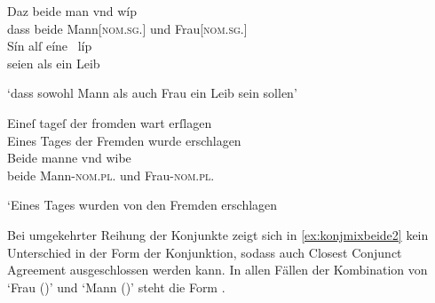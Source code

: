 \begin{exe}
\ex \label{ex:konjmixbeide1}
	\begin{xlist}
	\ex \gll Daz beide man vnd wíp \\
			dass beide Mann[\textsc{nom.sg.\MascM}] und Frau[\textsc{nom.sg.\NeutF}] \\
	\sn \gll Sín alſ eíne~ líp \\
			seien als ein Leib \\
		\begin{taggedline}{\parencites[\pno~45vb,12--13]{kc:VB}[vgl.][9536--9537]{schroeder1895}}
		\trans `dass sowohl Mann als auch Frau ein Leib sein sollen'
		\end{taggedline}
		\label{ex:konjmixbeide1_1}

	\ex \label{ex:konjmixbeide1_2}
		\gll Eineſ tageſ der fromden wart erſlagen \\
			Eines Tages der Fremden wurde erschlagen \\
		\textelp{}
	\sn \gll Beide manne vnd wibe \\
			beide Mann-\textsc{nom.pl.\MascM} und Frau-\textsc{nom.pl.\NeutF} \\
		\begin{taggedline}{\parencites[\pno~3vb,11--14]{kc:VB}[vgl.][625--628]{schroeder1895}}
		\trans `Eines Tages wurden von den Fremden erschlagen 
		\end{taggedline}
	\end{xlist}
\end{exe}

Bei umgekehrter Reihung der Konjunkte zeigt sich in \cref{ex:konjmixbeide2}
kein Unterschied in der Form der Konjunktion, sodass auch Closest Conjunct
Agreement ausgeschlossen werden kann. In allen Fällen der Kombination von
 `Frau (\NeutF)' und  `Mann (\MascM)' steht die
Form .

